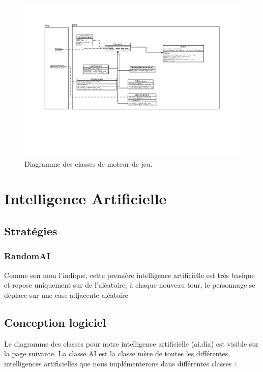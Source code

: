 \documentclass[a4paper,12pt]{article}
\begin{document}
\begin{landscape}
\begin{figure}[p]
\includegraphics[width=0.9\paperheight]{engine.pdf}
\caption{\label{uml:engine}Diagramme des classes de moteur de jeu.} 
\end{figure}
\end{landscape}


\section{Intelligence Artificielle}

\subsection{Stratégies}

\subsubsection{RandomAI}

Comme son nom l'indique, cette première intelligence artificielle est très basique et repose uniquement sur de l'aléatoire, à chaque nouveau tour, le personnage se déplace sur une case adjacente aléatoire

\clearpage
\subsection{Conception logiciel}

Le diagramme des classes pour notre intelligence artificielle (ai.dia) est visible sur la page suivante.
\bigbreak
La classe AI est la classe mère de toutes les différentes intelligences artificielles que nous implémenterons dans différentes classes :
\end{document}
